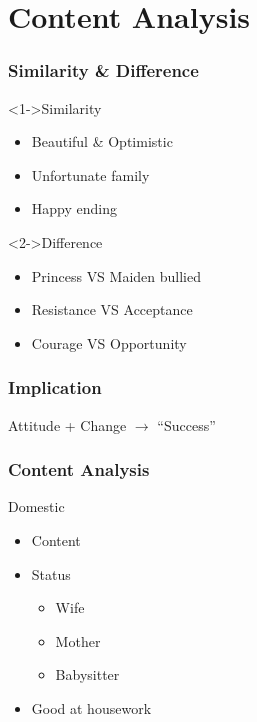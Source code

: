 \documentclass{beamer}
\begin{document}
\section{Content Analysis}

\begin{frame}
    \frametitle{Similarity \& Difference}
    \begin{block}<1->{Similarity}
        \begin{itemize}
            \item Beautiful \& Optimistic
            \item Unfortunate family
            \item Happy ending
        \end{itemize}
    \end{block}
    \begin{block}<2->{Difference}
        \begin{itemize}
            \item Princess \alert{VS} Maiden bullied
            \item Resistance \alert{VS} Acceptance
            \item Courage \alert{VS} Opportunity
        \end{itemize}
    \end{block}
\end{frame}

\begin{frame}
    \frametitle{Implication}
    \huge{Attitude + Change $\rightarrow$ ``Success''}
\end{frame}

\begin{frame}
    \frametitle{Content Analysis}
    \begin{block}{Domestic}
        \begin{itemize}
            \item Content
            \item Status
                  \begin{itemize}
                      \item Wife
                      \item Mother
                      \item Babysitter
                  \end{itemize}
            \item Good at housework
        \end{itemize}
    \end{block}
\end{frame}
\end{document}
